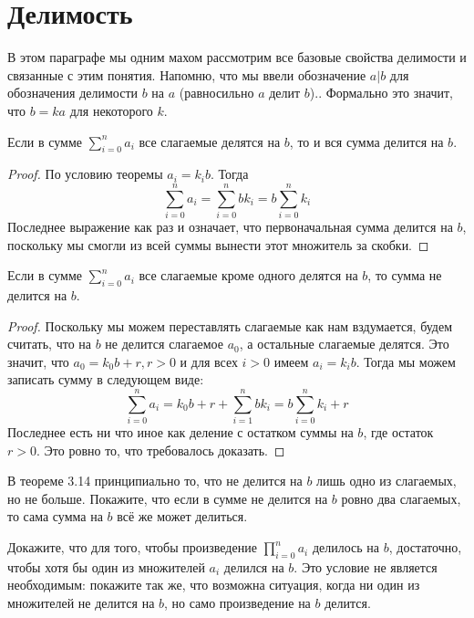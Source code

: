 \section{Делимость}

В этом параграфе мы одним махом рассмотрим все базовые свойства делимости и связанные с этим понятия. Напомню, что мы ввели обозначение $a|b$ для обозначения делимости $b$ на $a$ (равносильно $a$ делит $b$).. Формально это значит, что $b=ka$ для некоторого $k$.

\begin{thm}
Если в сумме $\sum_{i=0}^na_i$ все слагаемые делятся на $b$, то и вся сумма делится на $b$.
\end{thm}
\begin{proof}
По условию теоремы $a_i = k_i b$. Тогда
$$\sum_{i=0}^na_i = \sum_{i=0}^n bk_i = b\sum_{i=0}^n k_i$$
Последнее выражение как раз и означает, что первоначальная сумма делится на $b$, поскольку мы смогли из всей суммы вынести этот множитель за скобки.
\end{proof}

\begin{thm}
Если в сумме $\sum_{i=0}^na_i$ все слагаемые кроме одного делятся на $b$, то сумма не делится на $b$.
\end{thm}
\begin{proof}
Поскольку мы можем переставлять слагаемые как нам вздумается, будем считать, что на $b$ не делится слагаемое $a_0$, а остальные слагаемые делятся. Это значит, что $a_0 = k_0 b + r, r>0$ и для всех $i>0$ имеем $a_i=k_i b$. Тогда мы можем записать сумму в следующем виде:
$$\sum_{i=0}^na_i = k_0 b + r + \sum_{i=1}^n b k_i = b\sum_{i=0}^n k_i + r$$
Последнее есть ни что иное как деление с остатком суммы на $b$, где остаток $r>0$. Это ровно то, что требовалось доказать.
\end{proof}

\begin{exercise}
В теореме 3.14 принципиально то, что не делится на $b$ лишь одно из слагаемых, но не больше. Покажите, что если в сумме не делится на $b$ ровно два слагаемых, то сама сумма на $b$ всё же может делиться.
\end{exercise}

\begin{exercise}
Докажите, что для того, чтобы произведение $\prod_{i=0}^n a_i$ делилось на $b$, достаточно, чтобы хотя бы один из множителей $a_i$ делился на $b$. Это условие не является необходимым: покажите так же, что возможна ситуация, когда ни один из множителей не делится на $b$, но само произведение на $b$ делится.
\end{exercise}

